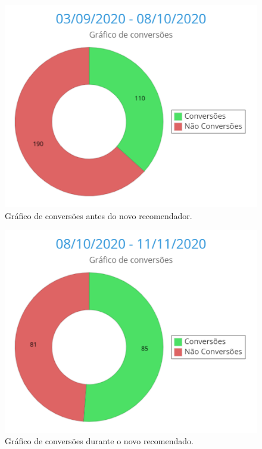 \begin{figure}[H]
    \centering
    \includegraphics[scale=0.6]{figuras/desenvolvimento/grafico1.png}
    \caption[Gráfico de conversões antes do novo recomendador]{Gráfico de conversões antes do novo recomendador.}
    \label{fig:grafico1}
\end{figure}

\begin{figure}[H]
    \centering
    \includegraphics[scale=0.6]{figuras/desenvolvimento/grafico2.png}
    \caption[Gráfico de conversões durante o novo recomendador]{Gráfico de conversões durante o novo recomendado.}
    \label{fig:grafico2}
\end{figure}

